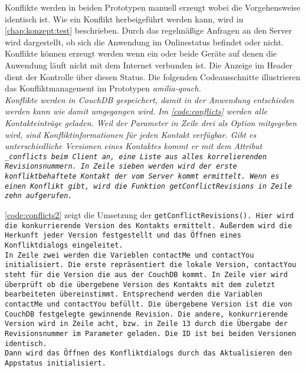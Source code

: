 Konflikte werden in beiden Prototypen manuell erzeugt wobei die Vorgehensweise identisch ist.
Wie ein Konflikt herbeigeführt werden kann, wird in \autoref{chap:konzept:test} beschrieben.
Durch das regelmäßige Anfragen an den Server wird dargestellt, ob sich die Anwendung im Onlinestatus befindet oder nicht.
Konflikte können erzeugt werden wenn ein oder beide Geräte auf denen die Anwendung läuft nicht mit dem Internet verbunden ist. Die Anzeige im Header dient der Kontrolle über diesen Status.
Die folgenden Codeausschnitte illustrieren das Konfliktmanagement im Prototypen \it{amilia-qouch}.\\
Konflikte werden in CouchDB gespeichert, damit in der Anwendung entschieden werden kann wie damit umgegangen wird.
Im \autoref{code:conflicts} werden alle Kontakteinträge geladen.
Weil der Parameter in Zeile drei als Option mitgegeben wird, sind Konfliktinformationen für jeden Kontakt verfügbar.
Gibt es unterschiedliche Versionen eines Kontaktes kommt er mit dem Attribut \tt{\_conflicts} beim Client an, eine Liste aus alles korrelierenden Revisionsnummern.
In Zeile sieben werden wird der erste konfliktbehaftete Kontakt der vom Server kommt ermittelt. Wenn es einen Konflikt gibt, wird die Funktion \tt{getConflictRevisions} in Zeile zehn aufgerufen.
%
\begin{center}
  
\end{center}
%
\autoref{code:conflicts2} zeigt die Umsetzung der \tt{getConflictRevisions()}.
Hier wird die konkurrierende Version des Kontakts ermittelt. Außerdem wird die Herkunft jeder Version festgestellt und das Öffnen eines Konfliktdialogs eingeleitet.\\
In Zeile zwei werden die Varieblen \tt{contactMe} und \tt{contactYou} initialisiert. Die erste repräsentiert die lokale Version, \tt{contactYou} steht für die Version die aus der CouchDB kommt.
In Zeile vier wird überprüft ob die übergebene Version des Kontakts mit dem zuletzt bearbeiteten übereinstimmt. Entsprechend werden die Variablen \tt{contactMe} und \tt{contactYou} befüllt.
Die übergebene Version ist die von CouchDB festgelegte gewinnende Revision.
Die andere, konkurrierende Version wird in Zeile acht, bzw. in Zeile 13 durch die Übergabe der Revisionsnummer im Parameter geladen.
Die ID ist bei beiden Versionen identisch.\\
Dann wird das Öffnen des Konfliktdialogs durch das Aktualisieren den \gls{App}status initialisiert.
